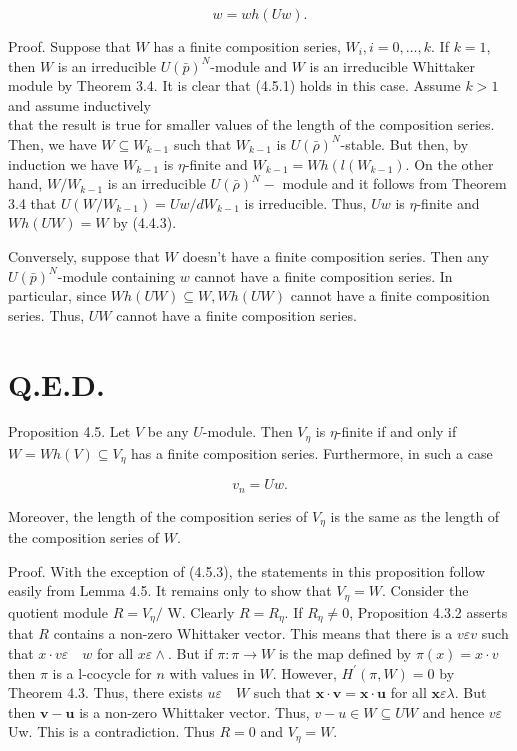 \documentclass[10pt]{article}
\begin{document}
\begin{equation*}
w=w h(U w) . \tag{4.5.1}
\end{equation*}


Proof. Suppose that $W$ has a finite composition series, $W_{i}, i=0, \ldots, k$. If $k=1$, then $W$ is an irreducible $U(\bar{p})^{N}$-module and $W$ is an irreducible Whittaker module by Theorem 3.4. It is clear that (4.5.1) holds in this case. Assume $k>1$ and assume inductively\\
that the result is true for smaller values of the length of the composition series. Then, we have $W \subseteq W_{k-1}$ such that $W_{k-1}$ is $U(\bar{\rho})^{N}$-stable. But then, by induction we have $W_{k-1}$ is $\eta$-finite and $W_{k-1}=W h\left(l\left(W_{k-1}\right)\right.$. On the other hand, $W / W_{k-1}$ is an irreducible $U(\bar{\rho})^{N}-$ module and it follows from Theorem 3.4 that $U\left(W / W_{k-1}\right)=U w / d W_{k-1}$ is irreducible. Thus, $U w$ is $\eta$-finite and $W h(U W)=W$ by (4.4.3).

Conversely, suppose that $W$ doesn't have a finite composition series. Then any $U(\bar{p})^{N}$-module containing $w$ cannot have a finite composition series. In particular, since $W h(U W) \subseteq W, W h(U W)$ cannot have a finite composition series. Thus, $U W$ cannot have a finite composition series.

\section{Q.E.D.}
Proposition 4.5. Let $V$ be any $U$-module. Then $V_{\eta}$ is $\eta$-finite if and only if $W=W h(V) \subseteq V_{\eta}$ has a finite composition series. Furthermore, in such a case


\begin{equation*}
v_{n}=U w . \tag{4.5.3}
\end{equation*}


Moreover, the length of the composition series of $V_{\eta}$ is the same as the length of the composition series of $W$.

Proof. With the exception of (4.5.3), the statements in this proposition follow easily from Lemma 4.5. It remains only to show that $V_{\eta}=W$. Consider the quotient module $R=V_{\eta} /$ W. Clearly $R=R_{\eta}$. If $R_{\eta} \neq 0$, Proposition 4.3.2 asserts that $R$ contains a non-zero Whittaker vector. This means that there is a $v \varepsilon v$ such that $x \cdot v \varepsilon \quad w$ for all $x \varepsilon \wedge$. But if $\pi: \pi \rightarrow W$ is the map defined by $\pi(x)=x \cdot v$ then $\pi$ is a l-cocycle for $n$ with values in $W$. However, $H^{\prime}(\pi, W)=0$ by Theorem 4.3. Thus, there exists $u \varepsilon \quad W$ such that $\mathbf{x} \cdot \mathbf{v}=\mathbf{x} \cdot \mathbf{u}$ for all $\mathbf{x} \varepsilon \lambda$. But then $\mathbf{v}-\mathbf{u}$ is a non-zero Whittaker vector. Thus, $v-u \in W \subseteq U W$ and hence $v \varepsilon$ Uw. This is a contradiction. Thus $R=0$ and $V_{\eta}=W$.
\end{document}
